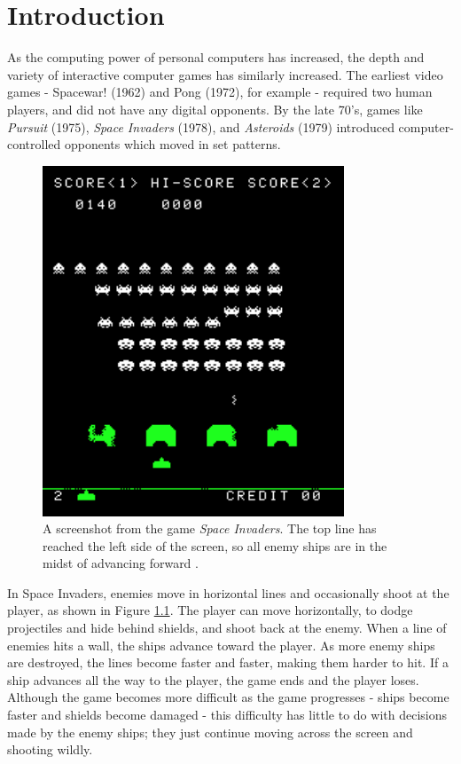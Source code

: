 \chapter{Introduction}
As the computing power of personal computers has increased, the depth and variety of interactive computer games has similarly increased. The earliest video games - Spacewar! (1962) and Pong (1972), for example - required two human players, and did not have any digital opponents. By the late 70's, games like \textit{Pursuit} (1975), \textit{Space Invaders} (1978), and \textit{Asteroids} (1979) introduced computer-controlled opponents which moved in set patterns.\\

\begin{figure}[H]
  \centering
  \includegraphics[width=9cm]{figures/space-invaders.png}
  \caption{A screenshot from the game \textit{Space Invaders}. The top line has reached the left side of the screen, so all enemy ships are in the midst of advancing forward \cite{spaceinvaders78}.}
  \label{fig:SpaceInvaders}
\end{figure}

In Space Invaders, enemies move in horizontal lines and occasionally shoot at the player, as shown in Figure \ref{fig:SpaceInvaders}. The player can move horizontally, to dodge projectiles and hide behind shields, and shoot back at the enemy. When a line of enemies hits a wall, the ships advance toward the player. As more enemy ships are destroyed, the lines become faster and faster, making them harder to hit. If a ship advances all the way to the player, the game ends and the player loses. Although the game becomes more difficult as the game progresses - ships become faster and shields become damaged - this difficulty has little to do with decisions made by the enemy ships; they just continue moving across the screen and shooting wildly.\\

